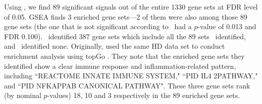 	
	Using \OurMethod, we find 89 significant signals out of the entire 1330 gene sets at FDR level
	of 0.05. GSEA finds 3 enriched gene sets---2 of them were also among those 89 gene sets (the one
	that is not significant according to \OurMethod~had a $p$-value of 0.013 and FDR 0.100).
	\genr~identified 387 gene sets which include all the 89 sets \OurMethod~identified, and 
	\CMT~identified none. Originally, \citet{labadorf2015rna} used the same HD data set to conduct 
	enrichment analysis using topGo \citep{alexa2010topgo}. They note that the enriched gene sets 
	they identified show a clear immune response and inflammation-related pattern, including 
	``REACTOME INNATE IMMUNE SYSTEM," ``PID IL4
	2PATHWAY," and ``PID NFKAPPAB CANONICAL PATHWAY". These three gene sets rank (by nominal
	$p$-values) 18, 10 and 3 respectively in the 89 enriched gene sets.
	
